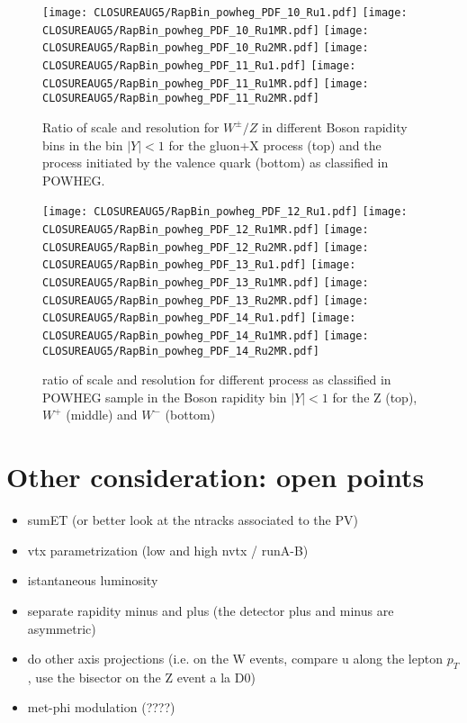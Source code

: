 \documentclass[41pt,a4paper,oneside]{report}
\begin{document}
\begin{figure}[h!]
  \begin{center}
    \texttt{[image: CLOSUREAUG5/RapBin\_powheg\_PDF\_10\_Ru1.pdf]}
    \texttt{[image: CLOSUREAUG5/RapBin\_powheg\_PDF\_10\_Ru1MR.pdf]}
    \texttt{[image: CLOSUREAUG5/RapBin\_powheg\_PDF\_10\_Ru2MR.pdf]}
    \texttt{[image: CLOSUREAUG5/RapBin\_powheg\_PDF\_11\_Ru1.pdf]}
    \texttt{[image: CLOSUREAUG5/RapBin\_powheg\_PDF\_11\_Ru1MR.pdf]}
    \texttt{[image: CLOSUREAUG5/RapBin\_powheg\_PDF\_11\_Ru2MR.pdf]}
    \caption{Ratio of scale and resolution for $W^{\pm}/Z$ in different Boson rapidity bins in the bin $|Y|<1$ for the gluon+X process (top) and the process initiated by the valence quark (bottom) as classified in POWHEG.}
    \label{fig:iterClosure12}
  \end{center}
  \begin{center}
    \texttt{[image: CLOSUREAUG5/RapBin\_powheg\_PDF\_12\_Ru1.pdf]}
    \texttt{[image: CLOSUREAUG5/RapBin\_powheg\_PDF\_12\_Ru1MR.pdf]}
    \texttt{[image: CLOSUREAUG5/RapBin\_powheg\_PDF\_12\_Ru2MR.pdf]}
    \texttt{[image: CLOSUREAUG5/RapBin\_powheg\_PDF\_13\_Ru1.pdf]}
    \texttt{[image: CLOSUREAUG5/RapBin\_powheg\_PDF\_13\_Ru1MR.pdf]}
    \texttt{[image: CLOSUREAUG5/RapBin\_powheg\_PDF\_13\_Ru2MR.pdf]}
    \texttt{[image: CLOSUREAUG5/RapBin\_powheg\_PDF\_14\_Ru1.pdf]}
    \texttt{[image: CLOSUREAUG5/RapBin\_powheg\_PDF\_14\_Ru1MR.pdf]}
    \texttt{[image: CLOSUREAUG5/RapBin\_powheg\_PDF\_14\_Ru2MR.pdf]}
    \caption{ratio of scale and resolution for different process as classified in POWHEG sample in the Boson rapidity bin $|Y|<1$ for the Z (top), $W^{+}$ (middle) and $W^{-}$ (bottom) }
    \label{fig:iterClosure13}
  \end{center}
\end{figure}

\newpage

\section{Other consideration: open points}
\begin{itemize}
\item sumET (or better look at the ntracks associated to the PV)
\item vtx parametrization (low and high nvtx / runA-B)
\item istantaneous luminosity
\item separate rapidity minus and plus (the detector plus and minus are asymmetric)
\item do other axis projections (i.e. on the W events, compare u along the lepton $p_{T}$, use the bisector on the Z event a la D0)
\item met-phi modulation (????)
\end{itemize}


\newpage

\end{document}
